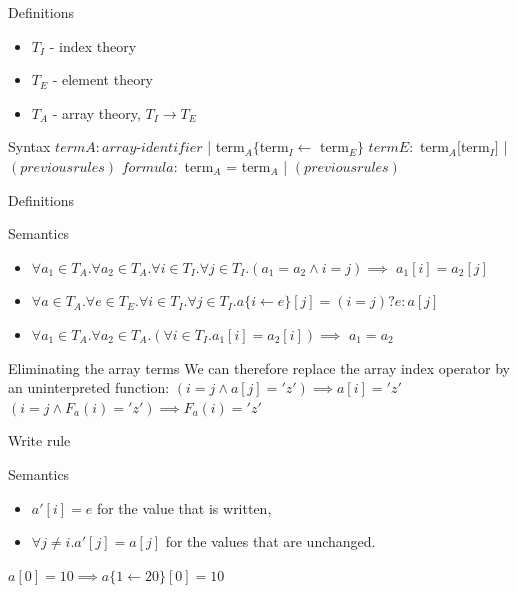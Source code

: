 \documentclass{beamer}
\begin{document}
\begin{frame}{Definitions}
\begin{itemize}
\item $T_I$ - index theory
\item $T_E$ - element theory
\item $T_A$ - array theory, $T_I \rightarrow T_E$
\end{itemize}
\begin{block}{Syntax}
$term A : array$-$identifier$ | term$_A\{$term$_I \leftarrow$ term$_E\}$\newline
$term E :$ term$_A[$term$_I]$ | $(previous rules)$\newline
$formula :$ term$_A$ = term$_A$ | $(previous rules)$\newline
\end{block}
\end{frame}

\begin{frame}{Definitions}
\begin{block}{Semantics}
\begin{itemize}
\item $\forall a_1 \in T_A. \forall a_2 \in T_A. \forall i \in T_I. \forall j \in T_I. (a_1 = a_2 \wedge i = j) \implies$\newline
$a_1[i] = a_2[j]$\newline
\item $\forall a \in T_A. \forall e \in T_E. \forall i \in T_I. \forall j \in T_I. a\{i\leftarrow e\}[j] = (i = j)? e : a[j]$\newline
\item$\forall a_1 \in T_A. \forall a_2 \in T_A. (\forall i \in T_I. a_1[i] = a_2 [i]) \implies$\newline
$a_1 = a_2$
\end{itemize}
\end{block}
\end{frame}

\begin{frame}{Eliminating the array terms}
We can therefore replace the array index operator by an uninterpreted function:\newline
$(i = j \wedge a[j] = 'z') \implies a[i] = 'z'$\newline
$(i = j \wedge F_a(i) = 'z') \implies F_a(i) = 'z'$\newline
\end{frame}

\begin{frame}{Write rule}
\begin{block}{Semantics}
\begin{itemize}
\item $a'[i] = e$ for the value that is written,
\item $\forall j \ne i. a'[j] = a[j]$ for the values that are unchanged.
\end{itemize}
\end{block}
$a[0] = 10 \implies a\{1 \leftarrow 20\}[0] = 10$\newline
\end{frame}
\end{document}
